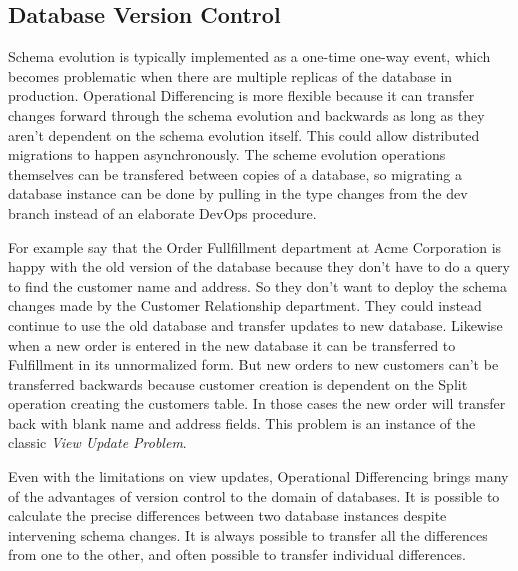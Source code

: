 \documentclass[english,submission]{programming}
\theoremstyle{definition}
\begin{document}
\subsection{Database Version Control}\label{db-vc}

Schema evolution is typically implemented as a one-time one-way event, which becomes problematic when there are multiple replicas of the database in production. Operational Differencing is more flexible because it can transfer changes forward through the schema evolution and backwards as long as they aren't dependent on the schema evolution itself. This could allow distributed migrations to happen asynchronously.
The scheme evolution operations themselves can be transfered between copies of a database, so migrating a database instance can be done by pulling in the type changes from the dev branch instead of an elaborate DevOps procedure.

For example say that the Order Fullfillment department at Acme Corporation is happy with the old version of the database because they don't have to do a query to find the customer name and address. So they don't want to deploy the schema changes made by the Customer Relationship department. They could instead continue to use the old database and transfer updates to new database. Likewise when a new order is entered in the new database it can be transferred to Fulfillment in its unnormalized form. But new orders to new customers can't be transferred backwards because customer creation is dependent on the \textsf{Split} operation creating the customers table. In those cases the new order will transfer back with blank name and address fields. This problem is an instance of the classic \textit{View Update Problem}\cite{Bancilhon81, Foster2007}.

Even with the limitations on view updates, Operational Differencing brings many of the advantages of version control to the domain of databases. It is possible to calculate the precise differences between two database instances despite intervening schema changes. It is always possible to transfer all the differences from one to the other, and often possible to transfer individual differences.
\end{document}
